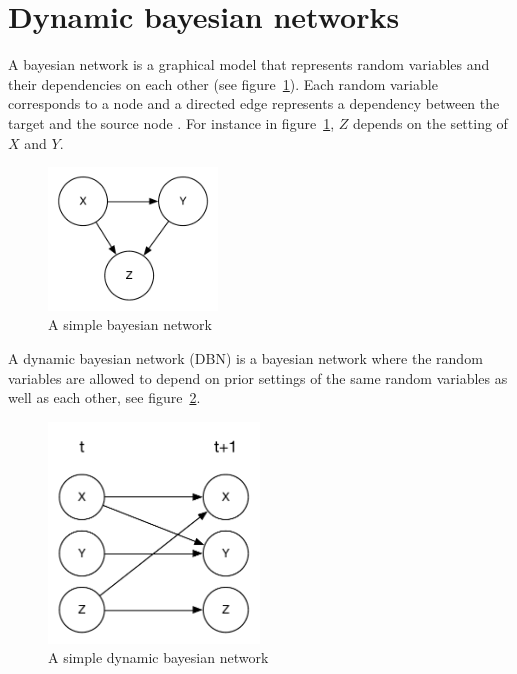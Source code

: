 \section{Dynamic bayesian networks}
\label{sec:dbn}

A bayesian network is a graphical model that represents random variables and
their dependencies on each other (see figure~\ref{fig:bn}). Each random variable
corresponds to a node and a directed edge represents a dependency between the
target and the source node \parencite{heckerman1998tutorial}. For instance in
figure~\ref{fig:bn}, $Z$ depends on the setting of $X$ and $Y$. 

\begin{figure}[H]
\centering
\includegraphics[width=0.4\textwidth]{images/BN.pdf}
\caption{A simple bayesian network}
\label{fig:bn}
\end{figure}

A dynamic bayesian network (DBN) is a bayesian network where the random
variables are allowed to depend on prior settings of the same random variables
as well as each other, see figure~\ref{fig:dbn}.

\begin{figure}[H]
    \centering
    \includegraphics[width=0.5\textwidth]{images/DBN.pdf}
    \caption{A simple dynamic bayesian network}
    \label{fig:dbn}
\end{figure}

